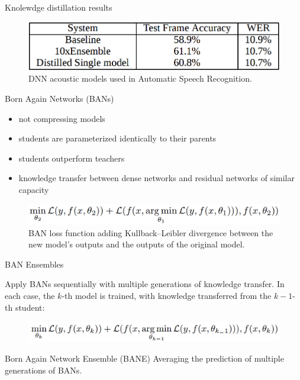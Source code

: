 \documentclass{beamer}
\begin{document}
\begin{frame}{Knolewdge distillation results}

\begin{figure}[h]
\includegraphics[width=\textwidth]{img/distilled_result}
\caption{DNN acoustic models used in Automatic Speech Recognition. \cite{cit:distill}}
\end{figure}

\end{frame}
\begin{frame}{Born Again Networks (BANs)}

\begin{itemize}
\item not compressing models
\item students are parameterized identically to their parents
\item students outperform teachers
\item knowledge transfer between dense networks and residual
networks of similar capacity
\end{itemize}

\vfill

\begin{figure}[h]
\includegraphics[width=\textwidth]{img/BAN_loss_func}
\caption{BAN loss function adding Kullback–Leibler divergence between the new model’s outputs and the outputs of the original model. \cite{cit:ban}}
\end{figure}

\end{frame}
\begin{frame}{BAN Ensembles}

Apply BANs sequentially with multiple generations of knowledge transfer. In
each case, the $k$-th model is trained, with knowledge transferred from the $k-1$-th student:

\begin{figure}[h]
\includegraphics[width=\textwidth]{img/sequential_ban1}
\end{figure}

\begin{block}{Born Again Network Ensemble (BANE)}
Averaging the prediction of multiple generations of BANs.
\end{block}
 

\end{frame}
\end{document}
